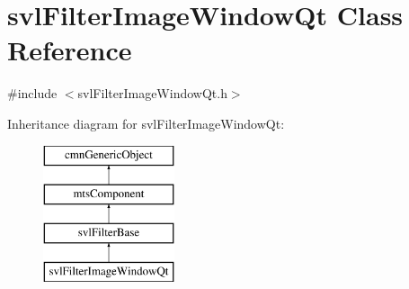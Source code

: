 \hypertarget{classsvl_filter_image_window_qt}{\section{svl\-Filter\-Image\-Window\-Qt Class Reference}
\label{classsvl_filter_image_window_qt}
}


{\ttfamily \#include $<$svl\-Filter\-Image\-Window\-Qt.\-h$>$}

Inheritance diagram for svl\-Filter\-Image\-Window\-Qt\-:\begin{figure}[H]
\begin{center}
\leavevmode
\includegraphics[height=4.000000cm]{dc/dc2/classsvl_filter_image_window_qt}
\end{center}
\end{figure}
